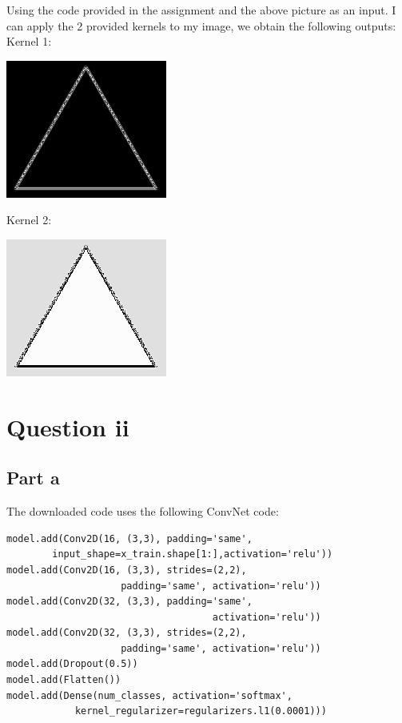 \documentclass[10pt]{article}
\begin{document}
Using the code provided in the assignment and the above picture as an input.
I can apply the 2 provided kernels to my image, we obtain the following
outputs:
\vspace{5mm} %
Kernel 1:
\begin{center}
    \includegraphics[scale=0.3]{ml_triangle_1.PNG}
\end{center}

\vspace{5mm} %
Kernel 2:
\begin{center}
    \includegraphics[scale=0.3]{ml_triangle_2.PNG}
\end{center}

\section*{Question ii}
\subsection*{Part a}
The downloaded code uses the following ConvNet code:
\begin{lstlisting}
model.add(Conv2D(16, (3,3), padding='same',
        input_shape=x_train.shape[1:],activation='relu'))
model.add(Conv2D(16, (3,3), strides=(2,2), 
                    padding='same', activation='relu'))
model.add(Conv2D(32, (3,3), padding='same', 
                                    activation='relu'))
model.add(Conv2D(32, (3,3), strides=(2,2),
                    padding='same', activation='relu'))
model.add(Dropout(0.5))
model.add(Flatten())
model.add(Dense(num_classes, activation='softmax',
            kernel_regularizer=regularizers.l1(0.0001)))
\end{lstlisting}
\end{document}

